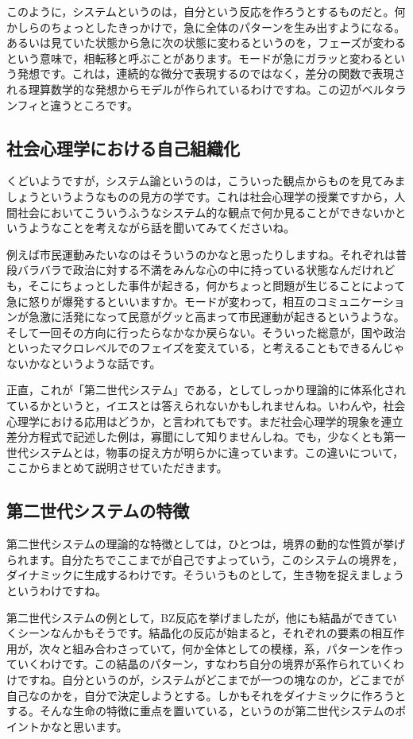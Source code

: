 \documentclass{ltjsbook}
\begin{document}
このように，システムというのは，自分という反応を作ろうとするものだと。何かしらのちょっとしたきっかけで，急に全体のパターンを生み出すようになる。あるいは見ていた状態から急に次の状態に変わるというのを，フェーズが変わるという意味で，相転移と呼ぶことがあります。モードが急にガラッと変わるという発想です。これは，連続的な微分で表現するのではなく，差分の関数で表現される理算数学的な発想からモデルが作られているわけですね。この辺がベルタランフィと違うところです。

\subsection{社会心理学における自己組織化}

くどいようですが，システム論というのは，こういった観点からものを見てみましょうというようなものの見方の学です。これは社会心理学の授業ですから，人間社会においてこういうふうなシステム的な観点で何か見ることができないかというようなことを考えながら話を聞いてみてくださいね。

例えば市民運動みたいなのはそういうのかなと思ったりしますね。それぞれは普段バラバラで政治に対する不満をみんな心の中に持っている状態なんだけれども，そこにちょっとした事件が起きる，何かちょっと問題が生じることによって急に怒りが爆発するといいますか。モードが変わって，相互のコミュニケーションが急激に活発になって民意がグッと高まって市民運動が起きるというような。そして一回その方向に行ったらなかなか戻らない。そういった総意が，国や政治といったマクロレベルでのフェイズを変えている，と考えることもできるんじゃないかなというような話です。

正直，これが「第二世代システム」である，としてしっかり理論的に体系化されているかというと，イエスとは答えられないかもしれませんね。いわんや，社会心理学における応用はどうか，と言われてもです。まだ社会心理学的現象を連立差分方程式で記述した例は，寡聞にして知りませんしね。でも，少なくとも第一世代システムとは，物事の捉え方が明らかに違っています。この違いについて，ここからまとめて説明させていただきます。

\subsection{第二世代システムの特徴}

第二世代システムの理論的な特徴としては，ひとつは，境界の動的な性質が挙げられます。自分たちでここまでが自己ですよっていう，このシステムの境界を，ダイナミックに生成するわけです。そういうものとして，生き物を捉えましょうというわけですね。

第二世代システムの例として，BZ反応を挙げましたが，他にも結晶ができていくシーンなんかもそうです。結晶化の反応が始まると，それぞれの要素の相互作用が，次々と組み合わさっていて，何か全体としての模様，系，パターンを作っていくわけです。この結晶のパターン，すなわち自分の境界が系作られていくわけですね。自分というのが，システムがどこまでが一つの塊なのか，どこまでが自己なのかを，自分で決定しようとする。しかもそれをダイナミックに作ろうとする。そんな生命の特徴に重点を置いている，というのが第二世代システムのポイントかなと思います。
\end{document}
